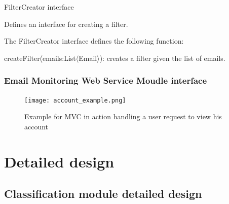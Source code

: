 \begin{my_itemize}
  \item FilterCreator interface
  \begin{my_desc}
   \item[Purpose] Defines an interface for creating a filter.
   \item[Function] The FilterCreator interface defines the following function:
	\begin{my_itemize}
	\item createFilter(emails:List$\langle$Email$\rangle$): creates a filter given the list of emails.
	\end{my_itemize}
  \end{my_desc}

\end{my_itemize}

\subsubsection{Email Monitoring Web Service Moudle interface}

\begin{figure}
  \centering
  \texttt{[image: account\_example.png]}
  \caption[Example for MVC in action handling a user request to view his account]{Example for MVC in action handling a user request to view his account}
\end{figure}



\section{Detailed design}

\subsection{Classification module detailed design}

